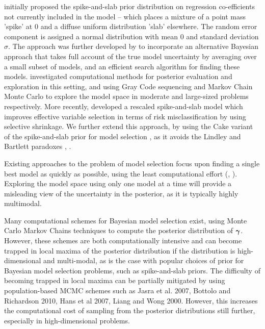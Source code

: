 
\cite{Mitchell1988} initially proposed the spike-and-slab prior distribution on regression co-efficients not
currently included in the model -- which places a mixture of a point mass 'spike' at $0$ and a diffuse uniform
distribution 'slab' elsewhere. The random error component is assigned a normal distribution with mean $0$ and
standard deviation $\sigma$. The approach was further developed by \cite{Madigan1994} to incorporate an
alternative Bayesian approach that takes full account of the true model uncertainty by averaging over a small
subset of models, and an efficient search algorithm for finding these models. \cite{George1997} investigated
computational methods for posterior evaluation and exploration in this setting, and using Gray Code sequencing
and Markov Chain Monte Carlo to explore the model space in moderate and large-sized problems respectively.
More recently, \cite{Ishwaran2005} developed a rescaled spike-and-slab model which improves effective variable
selection in terms of risk misclassification by using selective shrinkage. We further extend this approach, by
using the Cake variant of the spike-and-slab prior for model selection \cite{OrmerodEtal2017}, as it avoids
the Lindley and Bartlett paradoxes \cite{Lindley1957}, \cite{Bartlett1957}.

Existing approaches to the problem of model selection focus upon finding a single best model as quickly as
possible, using the least computational effort (\cite{You2014}, \cite{Rockova2014}). Exploring the model space
using only one model at a time will provide a misleading view of the uncertainty in the posterior, as it is
typically highly multimodal.

Many computational schemes for Bayesian model selection exist, using Monte Carlo Markov Chains techniques to
compute the posterior distribution of ${\boldsymbol \gamma}$. However, these schemes are both computationally intensive and
can become trapped in local maxima of the posterior distribution if the distribution is high-dimensional and
multi-modal, as is the case with popular choices of prior for Bayesian model selection problems, such as
spike-and-slab priors. The difficulty of becoming trapped in local maxima can be partially mitigated by using
population-based MCMC schemes such as Jasra et al. 2007, Bottolo and Richardson 2010, Hans et al 2007, Liang
and Wong 2000. However, this increases the computational cost of sampling from the posterior distributions
still further, especially in high-dimensional problems.

